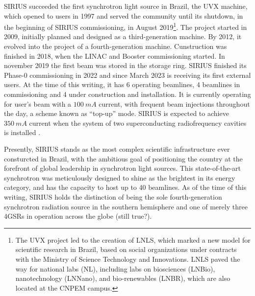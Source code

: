 SIRIUS succeeded the first synchrotron light source in Brazil, the UVX machine, which opened to users in 1997 and served the community until its shutdown, in the beginning of SIRIUS commissioning, in August 2019\footnote{The UVX project led to the creation of LNLS, which marked a new model for scientific research in Brazil, based on social organizations under contracts with the Ministry of Science Technology and Innovations. LNLS paved the way for national labs (NL), including labs on biosciences (LNBio), nanotechnology (LNNano), and bio-renewables (LNBR), which are also located at the CNPEM campus.}\cite{liu_synchrotron_2019}. The project started in 2009, initially planned and designed as a third-generation machine. By 2012, it evolved into the project of a fourth-generation machine\cite{liu_synchrotron_2019}. Cunstruction was finished in 2018, when the LINAC and Booster commissioning started. In november 2019 the first beam was stored in the storage ring.
SIRIUS finished its Phase-0 commissioning in 2022 and since March 2023 is receiving its first external users. At the time of this writing, it has 6 operating beamlines, 4 beamlines in commissioning and 4 under construction and installation. It is currently operating for user's beam with a $100~\unit{mA}$ current, with frequent beam injections throughout the day, a scheme known as ``top-up'' mode. SIRIUS is expected to achieve $350~\unit{mA}$ current when the system of two superconducting radiofrequency cavities is installed \cite{liu_status_2022,liu_status_2023}.

Presently, SIRIUS stands as the most complex scientific infrastructure ever consturcted in Brazil, with the ambitious goal of positioning the country at the forefront of global leadership in synchrotron light sources. This state-of-the-art synchrotron was meticulously designed to shine as the brightest in its energy category, and has the capacity to host up to 40 beamlines. As of the time of this writing, SIRIUS holds the distinction of being the sole fourth-generation synchrotron radiation source in the southern hemisphere and one of merely three 4GSRs in operation across the globe (still true?).


